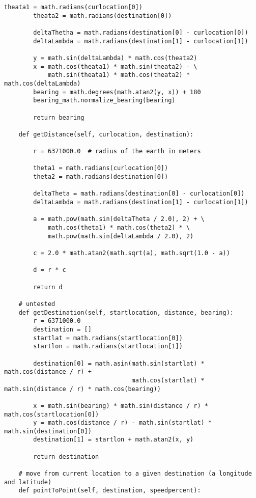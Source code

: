 \begin{lstlisting}[style=custompython, label=Algorithms-code, caption=full code for the Algorithms class]
        theata1 = math.radians(curlocation[0])
        theata2 = math.radians(destination[0])

        deltaThetha = math.radians(destination[0] - curlocation[0])
        deltaLambda = math.radians(destination[1] - curlocation[1])

        y = math.sin(deltaLambda) * math.cos(theata2)
        x = math.cos(theata1) * math.sin(theata2) - \
            math.sin(theata1) * math.cos(theata2) * math.cos(deltaLambda)
        bearing = math.degrees(math.atan2(y, x)) + 180
        bearing_math.normalize_bearing(bearing)

        return bearing

    def getDistance(self, curlocation, destination):

        r = 6371000.0  # radius of the earth in meters

        theta1 = math.radians(curlocation[0])
        theta2 = math.radians(destination[0])

        deltaTheta = math.radians(destination[0] - curlocation[0])
        deltaLambda = math.radians(destination[1] - curlocation[1])

        a = math.pow(math.sin(deltaTheta / 2.0), 2) + \
            math.cos(theta1) * math.cos(theta2) * \
            math.pow(math.sin(deltaLambda / 2.0), 2)

        c = 2.0 * math.atan2(math.sqrt(a), math.sqrt(1.0 - a))

        d = r * c

        return d

    # untested
    def getDestination(self, startlocation, distance, bearing):
        r = 6371000.0
        destination = []
        startlat = math.radians(startlocation[0])
        startlon = math.radians(startlocation[1])

        destination[0] = math.asin(math.sin(startlat) * math.cos(distance / r) +
                                   math.cos(startlat) * math.sin(distance / r) * math.cos(bearing))

        x = math.sin(bearing) * math.sin(distance / r) * math.cos(startlocation[0])
        y = math.cos(distance / r) - math.sin(startlat) * math.sin(destination[0])
        destination[1] = startlon + math.atan2(x, y)

        return destination

    # move from current location to a given destination (a longitude and latitude)
    def pointToPoint(self, destination, speedpercent):


\end{lstlisting}
